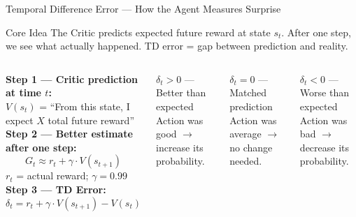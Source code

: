 \documentclass[10pt, aspectratio=169]{beamer}
\begin{document}
\begin{frame}{Temporal Difference Error --- How the Agent Measures Surprise}

\begin{exampleblock}{Core Idea}
  \centering\small
  The Critic predicts expected future reward at state $s_t$.
  After one step, we see what \alert{actually happened}.
  TD error = gap between prediction and reality.
\end{exampleblock}

\vspace{0.15cm}
\begin{columns}[T,onlytextwidth]
\footnotesize
\textbf{Step 1 --- Critic prediction at time $t$:}\\
$V(s_t)$ = ``From this state, I expect $X$ total future reward''\\[6pt]
\textbf{Step 2 --- Better estimate after one step:}
\[
  G_t \approx r_t + \gamma \cdot V(s_{t+1})
\]
$r_t$ = actual reward; $\gamma = 0.99$\\[6pt]
\textbf{Step 3 --- TD Error:}
\[
  \boxed{\delta_t = r_t + \gamma \cdot V(s_{t+1}) - V(s_t)}
\]

\begin{exampleblock}{\centering $\delta_t > 0$ --- {Better than expected}}
  \footnotesize Action was good $\to$ increase its probability.
\end{exampleblock}

\vspace{0.1cm}
\begin{block}{\centering $\delta_t = 0$ --- Matched prediction}
  \footnotesize Action was average $\to$ no change needed.
\end{block}

\vspace{0.1cm}
\begin{alertblock}{\centering $\delta_t < 0$ --- {Worse than expected}}
  \footnotesize Action was bad $\to$ decrease its probability.
\end{alertblock}
\end{columns}

\vspace{0.2cm}
\begin{center}
\end{center}
\end{frame}
\end{document}
